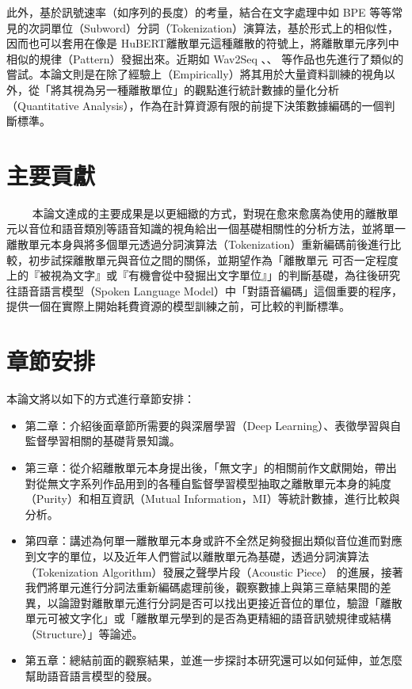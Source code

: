 此外，基於訊號速率（如序列的長度）的考量，結合在文字處理中如 BPE 等等常見的次詞單位（Subword）分詞（Tokenization）演算法，基於形式上的相似性，因而也可以套用在像是 HuBERT離散單元這種離散的符號上，將離散單元序列中相似的規律（Pattern）發掘出來。近期如 Wav2Seq \cite{wu_wav2seq_2023}、\cite{ren_speech_2022}、\cite{chang_exploring_2024} 等作品也先進行了類似的嘗試。本論文則是在除了經驗上（Empirically）將其用於大量資料訓練的視角以外，從「將其視為另一種離散單位」的觀點進行統計數據的量化分析（Quantitative Analysis），作為在計算資源有限的前提下決策數據編碼的一個判斷標準。

\section{主要貢獻}
　　
本論文達成的主要成果是以更細緻的方式，對現在愈來愈廣為使用的離散單元以音位和語音類別等語音知識的視角給出一個基礎相關性的分析方法，並將單一離散單元本身與將多個單元透過分詞演算法（Tokenization）重新編碼前後進行比較，初步試探離散單元與音位之間的關係，並期望作為「離散單元 可否一定程度上的『被視為文字』或『有機會從中發掘出文字單位』」的判斷基礎，為往後研究往語音語言模型（Spoken Language Model）中「對語音編碼」這個重要的程序，提供一個在實際上開始耗費資源的模型訓練之前，可比較的判斷標準。

\section{章節安排}

本論文將以如下的方式進行章節安排：

\begin{itemize}
  \itemsep -2pt %
  \item  第二章：介紹後面章節所需要的與深層學習（Deep Learning）、表徵學習與自監督學習相關的基礎背景知識。
  \item  第三章：從介紹離散單元本身提出後，「無文字」的相關前作文獻開始，帶出對從無文字系列作品用到的各種自監督學習模型抽取之離散單元本身的純度（Purity）和相互資訊（Mutual Information，MI）等統計數據，進行比較與分析。
  \item  第四章：講述為何單一離散單元本身或許不全然足夠發掘出類似音位進而對應到文字的單位，以及近年人們嘗試以離散單元為基礎，透過分詞演算法（Tokenization Algorithm）發展之聲學片段（Acoustic Piece） 的進展，接著我們將單元進行分詞法重新編碼處理前後，觀察數據上與第三章結果間的差異，以論證對離散單元進行分詞是否可以找出更接近音位的單位，驗證「離散單元可被文字化」或「離散單元學到的是否為更精細的語音訊號規律或結構（Structure）」等論述。
  \item  第五章：總結前面的觀察結果，並進一步探討本研究還可以如何延伸，並怎麼幫助語音語言模型的發展。
\end{itemize}
